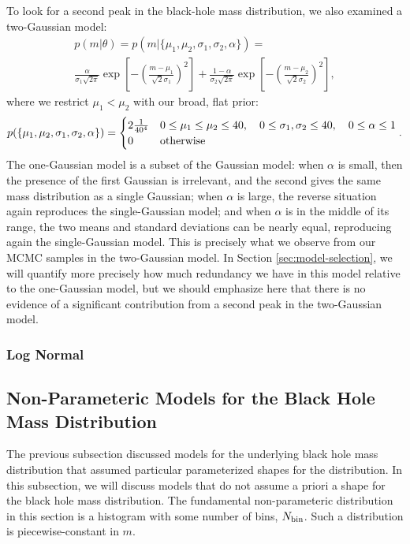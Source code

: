 \documentclass[preprint]{aastex}
\newcommand{\Nbin}{N_{\textnormal{bin}}}
\begin{document}
To look for a second peak in the black-hole mass distribution, we also
examined a two-Gaussian model:
\begin{multline}
  p(m|\theta) = p(m|\{\mu_1, \mu_2, \sigma_1, \sigma_2, \alpha\}) = \\
  \frac{\alpha}{\sigma_1 \sqrt{2\pi}} \exp\left[ - \left( \frac{m -
        \mu_1}{\sqrt{2}\sigma_1} \right)^2 \right] + \frac{1-\alpha}{\sigma_2 \sqrt{2\pi}} \exp\left[ - \left( \frac{m -
        \mu_2}{\sqrt{2}\sigma_2} \right)^2 \right],
\end{multline}
where we restrict $\mu_1 < \mu_2$ with our broad, flat prior:
\begin{equation}
  p(\{\mu_1, \mu_2, \sigma_1, \sigma_2, \alpha\}) = 
  \begin{cases}
    2 \frac{1}{40^4} & 0 \leq \mu_1 \leq \mu_2 \leq 40,
    \quad 0 \leq \sigma_1, \sigma_2 \leq 40, \quad 0 \leq \alpha \leq
    1 \\
    0 & \textnormal{otherwise}
  \end{cases}.
\end{equation}
The one-Gaussian model is a subset of the Gaussian model: when
$\alpha$ is small, then the presence of the first Gaussian is
irrelevant, and the second gives the same mass distribution as a
single Gaussian; when $\alpha$ is large, the reverse situation again
reproduces the single-Gaussian model; and when $\alpha$ is in the
middle of its range, the two means and standard deviations can be
nearly equal, reproducing again the single-Gaussian model.  This is
precisely what we observe from our MCMC samples in the two-Gaussian
model.  In Section \ref{sec:model-selection}, we will quantify more
precisely how much redundancy we have in this model relative to the
one-Gaussian model, but we should emphasize here that there is no
evidence of a significant contribution from a second peak in the
two-Gaussian model.

\subsubsection{Log Normal}
\label{sec:log-normal}

\subsection{Non-Parameteric Models for the Black Hole Mass Distribution}
\label{subsec:non-parameteric-models}

The previous subsection discussed models for the underlying black hole
mass distribution that assumed particular parameterized shapes for the
distribution.  In this subsection, we will discuss models that do not
assume a priori a shape for the black hole mass distribution.  The
fundamental non-parameteric distribution in this section is a
histogram with some number of bins, $\Nbin$.  Such a distribution is
piecewise-constant in $m$.
\end{document}
